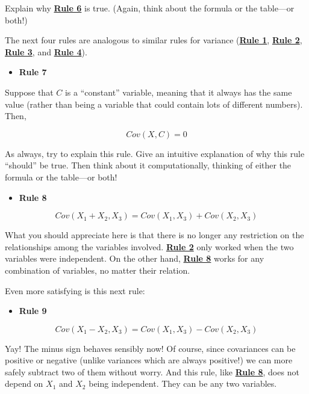 \documentclass[
]{book}
\providecommand{\tightlist}{%
  \setlength{\itemsep}{0pt}\setlength{\parskip}{0pt}}
\begin{document}
Explain why \protect\hyperlink{Rule6}{\textbf{Rule 6}} is true. (Again, think about the formula or the table---or both!)

The next four rules are analogous to similar rules for variance (\href{./variance.html\#Rule1}{\textbf{Rule 1}}, \href{./variance.html\#Rule2}{\textbf{Rule 2}}, \href{./variance.html\#Rule3}{\textbf{Rule 3}}, and \href{./variance.html\#Rule4}{\textbf{Rule 4}}).

\begin{itemize}
\tightlist
\item
  \textbf{Rule 7}
\end{itemize}

Suppose that \(C\) is a ``constant'' variable, meaning that it always has the same value (rather than being a variable that could contain lots of different numbers). Then,

\[
Cov\left(X, C\right) = 0
\]

As always, try to explain this rule. Give an intuitive explanation of why this rule ``should'' be true. Then think about it computationally, thinking of either the formula or the table---or both!

\begin{itemize}
\tightlist
\item
  \textbf{Rule 8}
\end{itemize}

\[
Cov\left(X_{1} + X_{2}, X_{3}\right) = Cov\left(X_{1}, X_{3}\right) + Cov\left(X_{2}, X_{3}\right)  
\]

What you should appreciate here is that there is no longer any restriction on the relationships among the variables involved. \href{./variance.html\#Rule2}{\textbf{Rule 2}} only worked when the two variables were independent. On the other hand, \protect\hyperlink{Rule8}{\textbf{Rule 8}} works for any combination of variables, no matter their relation.

Even more satisfying is this next rule:

\begin{itemize}
\tightlist
\item
  \textbf{Rule 9}
\end{itemize}

\[
Cov\left(X_{1} - X_{2}, X_{3}\right) = Cov\left(X_{1}, X_{3}\right) - Cov\left(X_{2}, X_{3}\right)  
\]

Yay! The minus sign behaves sensibly now! Of course, since covariances can be positive or negative (unlike variances which are always positive!) we can more safely subtract two of them without worry. And this rule, like \protect\hyperlink{Rule8}{\textbf{Rule 8}}, does not depend on \(X_{1}\) and \(X_{2}\) being independent. They can be any two variables.
\end{document}
